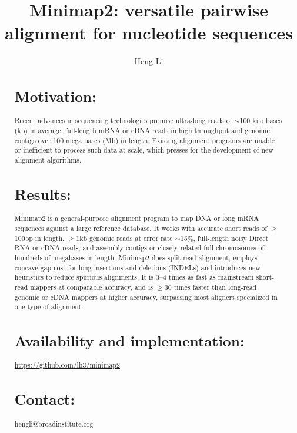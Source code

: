 \documentclass{bioinfo}
\begin{document}

\title[Aligning nucleotide sequences with minimap2]{Minimap2: versatile pairwise alignment for nucleotide sequences}
\author[Li]{Heng Li}
\address{Broad Institute, 415 Main Street, Cambridge, MA 02142, USA}

\maketitle

\begin{abstract}

\section{Motivation:} Recent advances in sequencing technologies promise
ultra-long reads of $\sim$100 kilo bases (kb) in average, full-length mRNA or
cDNA reads in high throughput and genomic contigs over 100 mega bases (Mb) in
length. Existing alignment programs are unable or inefficient to process such data
at scale, which presses for the development of new alignment algorithms.

\section{Results:} Minimap2 is a general-purpose alignment program to map DNA or long
mRNA sequences against a large reference database. It works with accurate short
reads of $\ge$100bp in length, $\ge$1kb genomic reads at error rate $\sim$15\%,
full-length noisy Direct RNA or cDNA reads, and assembly contigs or closely
related full chromosomes of hundreds of megabases in length. Minimap2 does
split-read alignment, employs concave gap cost for long insertions and
deletions (INDELs) and introduces new heuristics to reduce spurious alignments.
It is 3--4 times as fast as mainstream short-read mappers at comparable
accuracy, and is $\ge$30 times faster than long-read genomic or cDNA
mappers at higher accuracy, surpassing most aligners specialized in one type of
alignment.

\section{Availability and implementation:}
\href{https://github.com/lh3/minimap2}{https://github.com/lh3/minimap2}

\section{Contact:} hengli@broadinstitute.org
\end{abstract}
\end{document}
